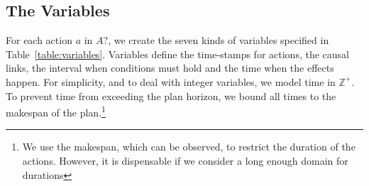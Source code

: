 \documentclass[runningheads]{llncs}
\newcommand{\dur}{\mathsf{dur}}    %
\newcommand{\start}{\mathsf{start}}%
\newcommand{\tim}{\mathsf{time}}   %
\newcommand{\reqs}{\mathsf{req\_{start}}} %
\newcommand{\reqe}{\mathsf{req\_{end}}}   %
\begin{document}


\subsection{The Variables}


For each action $a$ in $A?$, we create the seven kinds of variables specified in Table~\ref{table:variables}. Variables define the time-stamps for actions, the causal links, the interval when conditions must hold and the time when the effects happen. For simplicity, and to deal with integer variables, we model time in $\mathbb{Z}^+$. To prevent time from exceeding the plan horizon, we bound all times to the makespan of the plan.\footnote{We use the makespan, which can be observed, to restrict the duration of the actions. However, it is dispensable if we consider a long enough domain for durations}
\end{document}
